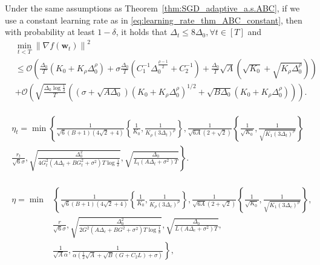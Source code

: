\documentclass[10pt,a4paper]{amsart}
\newcommand{\Kr}{K_{\rho}}
\newcommand{\Norm}[1]{\left\|#1\right\|}
\newcommand{\bw}{\mathbf{w}}
\newcommand{\paren}[1]{\left( #1 \right)}
\begin{document}
\begin{theorem}\label{thm:SGD_constant_a.s.ABC}
    Under the same assumptions as Theorem~\ref{thm:SGD_adaptive_a.s.ABC}, if we use a constant learning rate as in \eqref{eq:learning_rate_thm_ABC_constant}, 
    then with probability at least $1-\delta$, it holds that $\Delta_t\leq 8\Delta_0,\forall t\in[T]$ and
    $$
    \begin{aligned}
    &\min_{t<T} \Norm{\nabla f(\bw_t)}^2 \\
    &\leq \mathcal{O}\left(\frac{\Delta_0}{T}\left(K_0+K_\rho \Delta_0^\rho\right)+\sigma \frac{\Delta_0}{T}\left(C_1^{-1} \Delta_0^{\frac{\rho-1}{2}}+C_2^{-1}\right)+\frac{\Delta_0}{T} \sqrt{A}\left(\sqrt{K_0}+\sqrt{K_\rho \Delta_0^\rho}\right)\right) \\
    & +\mathcal{O}\left(\sqrt{\frac{\Delta_0 \log \frac{1}{\delta}}{T}}\left(\left(\sigma+\sqrt{A \Delta_0}\right)\left(K_0+K_\rho \Delta_0^\rho\right)^{1 / 2}+\sqrt{B \Delta_0}\left(K_0+K_\rho \Delta_0^\rho\right)\right)\right).
    \end{aligned}
    $$
    
\end{theorem}

\begin{align}\label{eq:learning_rate_thm_ABC_adaptive}
    \begin{gathered}
    \eta_t=\min \left\{\frac{1}{\sqrt{6}(B+1)(4 \sqrt{2}+4)}\left\{\frac{1}{K_0}, \frac{1}{K_\rho\left(3 \Delta_t\right)^\rho}\right\}, \frac{1}{\sqrt{6 A}(2+\sqrt{2})}\left\{\frac{1}{\sqrt{K_0}}, \frac{1}{\sqrt{K_1\left(3 \Delta_t\right)^\rho}}\right\}\right. \\
    \left.\frac{r_t}{\sqrt{6} \sigma}, \sqrt{\frac{\Delta_0^2}{4 G_t^2\left(A \Delta_t+B G_t^2+\sigma^2\right) T \log \frac{1}{\delta}}}, \sqrt{\frac{\Delta_0}{L_t\left(A \Delta_t+\sigma^2\right) T}}\right\} .
    \end{gathered}
\end{align}

\begin{align}\label{eq:learning_rate_thm_ABC_constant}
    \begin{aligned}
    \eta=\min&\left\{
        \frac{1}{\sqrt{6}(B+1)(4\sqrt{2}+4)}\left\{\frac{1}{K_0}, \frac{1}{\Kr\paren{3\Delta_c}^\rho}\right\},
        \frac{1}{\sqrt{6A}(2+\sqrt{2})}\left\{\frac{1}{\sqrt{K_0}}, \frac{1}{\sqrt{K_1 \paren{3\Delta_c}^\rho}}\right\},\right.\\
        &\left.\frac{r}{\sqrt{6}\sigma},\sqrt{\frac{\Delta_0^2}{2G^2\paren{A\Delta_c+BG^2+\sigma^2}T\log\frac{1}{\delta}}},
        \sqrt{\frac{\Delta_0}{L\paren{A\Delta_c+\sigma^2}T}}
        \right.,\\
        &\left.
        \frac{1}{\sqrt{A}\alpha}, \frac{1}{\alpha\paren{\frac{1}{2}\sqrt{A}+\sqrt{B}\paren{G+C_2L}+\sigma}}
        \right\},
    \end{aligned}
\end{align}
\end{document}
